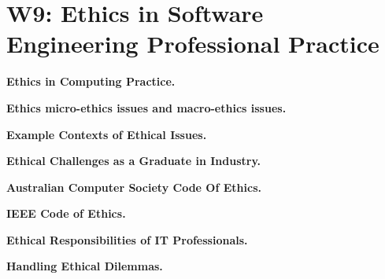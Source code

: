 \section{W9: Ethics in Software Engineering Professional Practice}

\textbf{Ethics in Computing Practice.}

\textbf{Ethics micro-ethics issues and macro-ethics issues.}

\textbf{Example Contexts of Ethical Issues.}

\textbf{Ethical Challenges as a Graduate in Industry.}

\textbf{Australian Computer Society Code Of Ethics.}

\textbf{IEEE Code of Ethics.}

\textbf{Ethical Responsibilities of IT Professionals.}

\textbf{Handling Ethical Dilemmas.}
